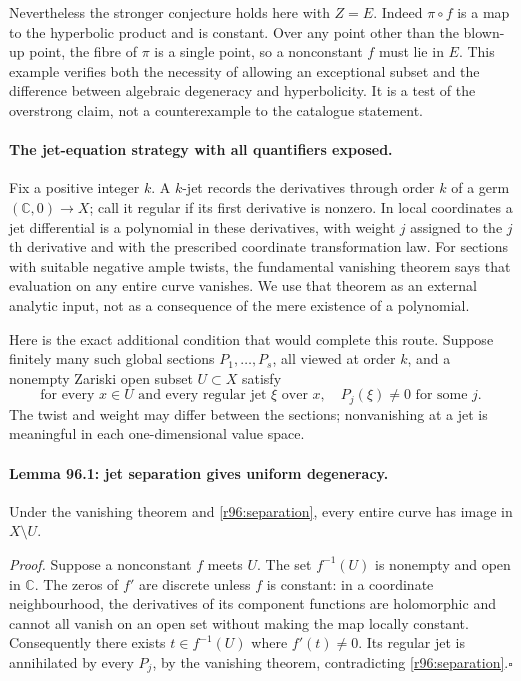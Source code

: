 \documentclass[11pt]{article}
\begin{document}
Nevertheless the stronger conjecture holds here with $Z=E$. Indeed
$\pi\circ f$ is a map to the hyperbolic product and is constant. Over
any point other than the blown-up point, the fibre of $\pi$ is a single
point, so a nonconstant $f$ must lie in $E$. This example verifies both
the necessity of allowing an exceptional subset and the difference
between algebraic degeneracy and hyperbolicity. It is a test of the
overstrong claim, not a counterexample to the catalogue statement.

\paragraph{The jet-equation strategy with all quantifiers exposed.}
Fix a positive integer $k$. A $k$-jet records the derivatives through
order $k$ of a germ $(\mathbb C,0)\to X$; call it regular if its first
derivative is nonzero. In local coordinates a jet differential is a
polynomial in these derivatives, with weight $j$ assigned to the
$j$th derivative and with the prescribed coordinate transformation law.
For sections with suitable negative ample twists, the fundamental
vanishing theorem says that evaluation on any entire curve vanishes.
We use that theorem as an external analytic input, not as a consequence
of the mere existence of a polynomial.

Here is the exact additional condition that would complete this route.
Suppose finitely many such global sections $P_1,\ldots,P_s$, all viewed
at order $k$, and a nonempty Zariski open subset $U\subset X$ satisfy
\begin{equation}\label{r96:separation}
 \text{for every }x\in U\text{ and every regular jet }\xi\text{ over }x,
 \quad P_j(\xi)\ne0\text{ for some }j.
\end{equation}
The twist and weight may differ between the sections; nonvanishing at
a jet is meaningful in each one-dimensional value space.

\paragraph{Lemma 96.1: jet separation gives uniform degeneracy.}
Under the vanishing theorem and \eqref{r96:separation}, every entire
curve has image in $X\setminus U$.

\emph{Proof.} Suppose a nonconstant $f$ meets $U$. The set
$f^{-1}(U)$ is nonempty and open in $\mathbb C$. The zeros of $f'$ are
discrete unless $f$ is constant: in a coordinate neighbourhood, the
derivatives of its component functions are holomorphic and cannot all
vanish on an open set without making the map locally constant.
Consequently there exists $t\in f^{-1}(U)$ where $f'(t)\ne0$.
Its regular jet is annihilated by every $P_j$, by the vanishing theorem,
contradicting \eqref{r96:separation}.\hfill$\square$
\end{document}

